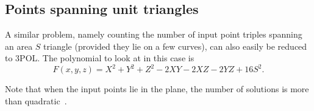 \subsection{Points spanning unit triangles}%
\label{sec:paper:3pol-algorithm:application:triangles}

A similar problem, namely counting the number of input point triples spanning
an area $S$ triangle (provided they lie on a few curves), can also easily be
reduced to 3POL\@.
%
The polynomial to look at in this case is
\begin{displaymath}
	F(x,y,z) = X^2 + Y^2 + Z^2 - 2XY - 2XZ - 2YZ + 16 S^2.
\end{displaymath}

Note that when the input points lie in the plane, the number of solutions is
more than quadratic~\cite{RS15,RSS15b}.
